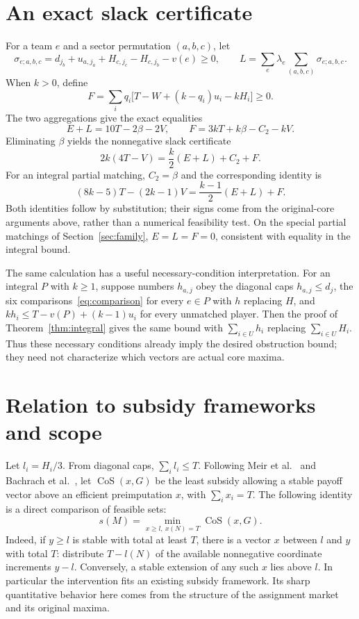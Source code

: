 \documentclass[11pt]{article}
\theoremstyle{remark}
\begin{document}
\section{An exact slack certificate}\label{sec:slack}
For a team $e$ and a sector permutation $(a,b,c)$, let
\[
 \sigma_{e;a,b,c}
    =d_{j_b}+u_{a,j_a}+H_{c,j_c}-H_{c,j_b}-v(e)\ge0,
 \qquad
 L=\sum_e\lambda_e\sum_{(a,b,c)}\sigma_{e;a,b,c}.
\]
When $k>0$, define
\[
                  F=\sum_iq_i\bigl[T-W+(k-q_i)u_i-kH_i\bigr]\ge0.
\]
The two aggregations give the exact equalities
\[
       E+L=10T-2\beta-2V,\qquad F=3kT+k\beta-C_2-kV.
\]
Eliminating $\beta$ yields the nonnegative slack certificate
\begin{equation}\label{eq:slack}
                 2k(4T-V)=\frac{k}{2}(E+L)+C_2+F.
\end{equation}
For an integral partial matching, $C_2=\beta$ and the corresponding identity is
\begin{equation}\label{eq:integralslack}
                 (8k-5)T-(2k-1)V=\frac{k-1}{2}(E+L)+F.
\end{equation}
Both identities follow by substitution; their signs come from the
original-core arguments above, rather than a numerical feasibility test.
On the special partial matchings of Section~\ref{sec:family}, $E=L=F=0$,
consistent with equality in the integral bound.

The same calculation has a useful necessary-condition interpretation.
For an integral $P$ with $k\ge1$, suppose numbers $h_{a,j}$ obey the diagonal caps
$h_{a,j}\le d_j$, the six comparisons~\eqref{eq:comparison} for every
$e\in P$ with $h$ replacing $H$, and
$kh_i\le T-v(P)+(k-1)u_i$ for every unmatched player.
Then the proof of Theorem~\ref{thm:integral} gives the same bound with
$\sum_{i\in U}h_i$ replacing $\sum_{i\in U}H_i$.
Thus these necessary conditions already imply the desired obstruction
bound; they need not characterize which vectors are actual core maxima.

\section{Relation to subsidy frameworks and scope}\label{sec:framework}
Let $l_i=H_i/3$. From diagonal caps, $\sum_i l_i\le T$.
Following Meir et al.~\cite[Section~2.2]{Meir2011} and
Bachrach et al.~\cite[Section~5]{Bachrach2018}, let
$\operatorname{CoS}(x,G)$ be the least subsidy allowing a stable payoff
vector above an efficient preimputation $x$, with $\sum_ix_i=T$.
The following identity is a direct comparison of feasible sets:
\begin{equation}\label{eq:cos}
       s(M)=\min_{x\ge l,\ x(N)=T}\operatorname{CoS}(x,G).
\end{equation}
Indeed, if $y\ge l$ is stable with total at least $T$, there is a vector
$x$ between $l$ and $y$ with total $T$: distribute $T-l(N)$ of the
available nonnegative coordinate increments $y-l$. Conversely, a stable
extension of any such $x$ lies above $l$. In particular the intervention
fits an existing subsidy framework. Its sharp quantitative behavior here
comes from the structure of the assignment market and its original maxima.
\end{document}
